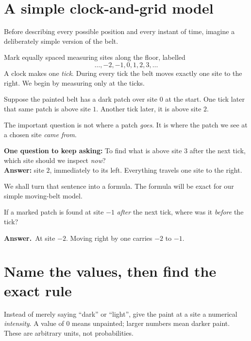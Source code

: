 \documentclass[11pt,a4paper]{article}
\newcommand{\secstart}[1]{\Needspace{7\baselineskip}\section{#1}}
\newcommand{\answer}{\par\smallskip\textbf{Answer.}~}
\begin{document}
\clearpage
\secstart{A simple clock-and-grid model}
Before describing every possible position and every instant of time, imagine a deliberately simple version of the belt.

Mark equally spaced measuring sites along the floor, labelled
\[
\ldots,-2,-1,0,1,2,3,\ldots
\]
A clock makes one \emph{tick}. During every tick the belt moves exactly one site to the right. We begin by measuring only at the ticks.

Suppose the painted belt has a dark patch over site $0$ at the start. One tick later that same patch is above site $1$. Another tick later, it is above site $2$.

\begin{center}
\end{center}
The important question is not where a patch \emph{goes}. It is where the patch we see at a chosen site \emph{came from}.

\begin{pointbox}
\textbf{One question to keep asking:} To find what is above site $3$ after the next tick, which site should we inspect \emph{now}?\\
\textbf{Answer:} site $2$, immediately to its left. Everything travels one site to the right.
\end{pointbox}
We shall turn that sentence into a formula. The formula will be exact for our simple moving-belt model.

\begin{thinkbox}
If a marked patch is found at site $-1$ \emph{after} the next tick, where was it \emph{before} the tick?
\answer At site $-2$. Moving right by one carries $-2$ to $-1$.
\end{thinkbox}

\clearpage
\secstart{Name the values, then find the exact rule}
Instead of merely saying ``dark'' or ``light'', give the paint at a site a numerical \emph{intensity}. A value of $0$ means unpainted; larger numbers mean darker paint. These are arbitrary units, not probabilities.
\end{document}
